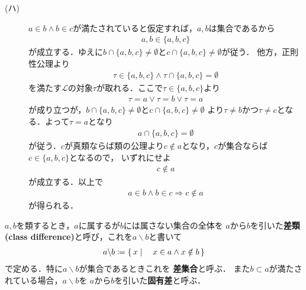 \begin{prf}
\begin{description}
			\item[(ハ)]
				$a \in b \wedge b \in c$が満たされていると仮定すれば，$a,b$は集合であるから
				\begin{align}
					a,b \in \{a,b,c\}
				\end{align}
				が成立する．ゆえに$b \cap \{a,b,c\} \neq \emptyset$と$c \cap \{a,b,c\} \neq \emptyset$が従う．
				他方，正則性公理より
				\begin{align}
					\tau \in \{a,b,c\} \wedge \tau \cap \{a,b,c\} = \emptyset
				\end{align}
				を満たす$\mathcal{L}$の対象$\tau$が取れる．ここで$\tau \in \{a,b,c\}$より
				\begin{align}
					\tau = a \vee \tau = b \vee \tau = a
				\end{align}
				が成り立つが，$b \cap \{a,b,c\} \neq \emptyset$と$c \cap \{a,b,c\} \neq \emptyset$
				より$\tau \neq b$かつ$\tau \neq c$となる．よって$\tau = a$となり
				\begin{align}
					a \cap \{a,b,c\} = \emptyset
				\end{align}
				が従う．$c$が真類ならば類の公理より$c \notin a$となり，$c$が集合ならば$c \in \{a,b,c\}$となるので，
				いずれにせよ
				\begin{align}
					c \notin a
				\end{align}
				が成立する．以上で
				\begin{align}
					a \in b \wedge b \in c \Longrightarrow c \notin a
				\end{align}
				が得られる．
				\QED
		\end{description}
	\end{prf}
	
	
	\begin{screen}
		\begin{dfn}[類の差]
			$a,b$を類するとき，$a$に属するが$b$には属さない集合の全体を
			$a$から$b$を引いた{\bf 差類}
			{\bf (class difference)}と呼び，これを$a \backslash b$と書いて
			\begin{align}
				a \backslash b \coloneqq \left\{\, x \mid \quad x \in a \wedge x \notin b\, \right\}
			\end{align}
			で定める．特に$a \backslash b$が集合であるときこれを
			{\bf 差集合}と呼ぶ．
			また$b \subset a$が満たされている場合，$a \backslash b$を
			$a$から$b$を引いた{\bf 固有差}と呼ぶ．
		\end{dfn}
	\end{screen}
	
